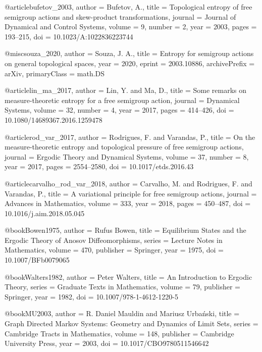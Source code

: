 @article{bufetov_2003,
  author = {Bufetov, A.},
  title = {Topological entropy of free semigroup actions and skew-product transformations},
  journal = {Journal of Dynamical and Control Systems},
  volume = {9},
  number = {2},
  year = {2003},
  pages = {193--215},
  doi = {10.1023/A:1022836223744}
}

@misc{souza_2020,
  author = {Souza, J. A.},
  title = {Entropy for semigroup actions on general topological spaces},
  year = {2020},
  eprint = {2003.10886},
  archivePrefix = {arXiv},
  primaryClass = {math.DS}
}

@article{lin_ma_2017,
  author = {Lin, Y. and Ma, D.},
  title = {Some remarks on measure-theoretic entropy for a free semigroup action},
  journal = {Dynamical Systems},
  volume = {32},
  number = {4},
  year = {2017},
  pages = {414--426},
  doi = {10.1080/14689367.2016.1259478}
}

@article{rod_var_2017,
  author = {Rodrigues, F. and Varandas, P.},
  title = {On the measure-theoretic entropy and topological pressure of free semigroup actions},
  journal = {Ergodic Theory and Dynamical Systems},
  volume = {37},
  number = {8},
  year = {2017},
  pages = {2554--2580},
  doi = {10.1017/etds.2016.43}
}

@article{carvalho_rod_var_2018,
  author = {Carvalho, M. and Rodrigues, F. and Varandas, P.},
  title = {A variational principle for free semigroup actions},
  journal = {Advances in Mathematics},
  volume = {333},
  year = {2018},
  pages = {450--487},
  doi = {10.1016/j.aim.2018.05.045}
}


@book{Bowen1975,
  author    = {Rufus Bowen},
  title     = {Equilibrium States and the Ergodic Theory of Anosov Diffeomorphisms},
  series    = {Lecture Notes in Mathematics},
  volume    = {470},
  publisher = {Springer},
  year      = {1975},
  doi       = {10.1007/BFb0079065}
}

@book{Walters1982,
  author    = {Peter Walters},
  title     = {An Introduction to Ergodic Theory},
  series    = {Graduate Texts in Mathematics},
  volume    = {79},
  publisher = {Springer},
  year      = {1982},
  doi       = {10.1007/978-1-4612-1220-5}
}

@book{MU2003,
  author    = {R. Daniel Mauldin and Mariusz Urba{\'n}ski},
  title     = {Graph Directed Markov Systems: Geometry and Dynamics of Limit Sets},
  series    = {Cambridge Tracts in Mathematics},
  volume    = {148},
  publisher = {Cambridge University Press},
  year      = {2003},
  doi       = {10.1017/CBO9780511546642}
}

